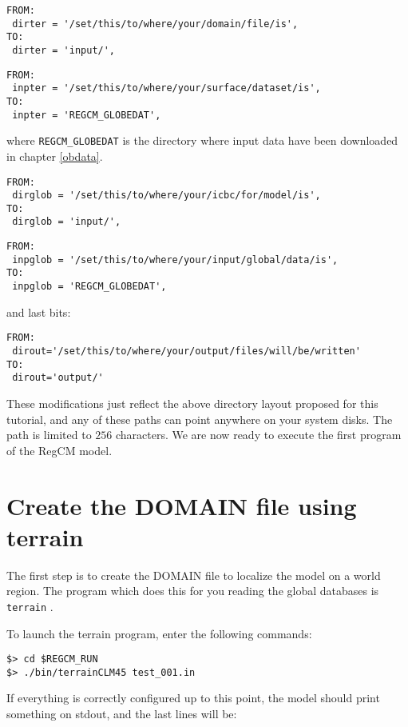 \begin{Verbatim}
FROM:
 dirter = '/set/this/to/where/your/domain/file/is',
TO:
 dirter = 'input/',
\end{Verbatim}

\begin{Verbatim}
FROM:
 inpter = '/set/this/to/where/your/surface/dataset/is',
TO:
 inpter = 'REGCM_GLOBEDAT',
\end{Verbatim}

where \verb=REGCM_GLOBEDAT= is the directory where input data have been
downloaded in chapter \ref{obdata}.

\begin{Verbatim}
FROM:
 dirglob = '/set/this/to/where/your/icbc/for/model/is',
TO:
 dirglob = 'input/',
\end{Verbatim}

\begin{Verbatim}
FROM:
 inpglob = '/set/this/to/where/your/input/global/data/is',
TO:
 inpglob = 'REGCM_GLOBEDAT',
\end{Verbatim}

and last bits:

\begin{Verbatim}
FROM:
 dirout='/set/this/to/where/your/output/files/will/be/written'
TO:
 dirout='output/'
\end{Verbatim}

These modifications just reflect the above directory layout proposed for this
tutorial, and any of these paths can point anywhere on your system disks.
The path is limited to $256$ characters.
We are now ready to execute the first program of the RegCM model.

\section{Create the DOMAIN file using terrain}

The first step is to create the DOMAIN file to localize the model on a world
region.
The program which does this for you reading the global databases is
\verb=terrain= .

To launch the terrain program, enter the following commands:

\begin{Verbatim}
$> cd $REGCM_RUN
$> ./bin/terrainCLM45 test_001.in
\end{Verbatim}

If everything is correctly configured up to this point, the model should print
something on stdout, and the last lines will be:

